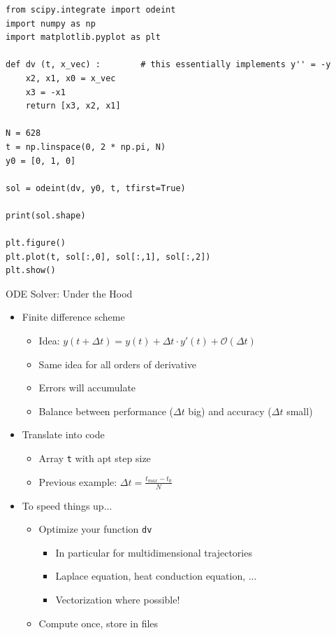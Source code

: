 
\begin{frame}[fragile]
%
\begin{codebox}
\begin{verbatim}
from scipy.integrate import odeint
import numpy as np
import matplotlib.pyplot as plt

def dv (t, x_vec) :        # this essentially implements y'' = -y
    x2, x1, x0 = x_vec
    x3 = -x1
    return [x3, x2, x1]

N = 628
t = np.linspace(0, 2 * np.pi, N)
y0 = [0, 1, 0]

sol = odeint(dv, y0, t, tfirst=True)

print(sol.shape)

plt.figure()
plt.plot(t, sol[:,0], sol[:,1], sol[:,2])
plt.show()
\end{verbatim}
\end{codebox}
%
\end{frame}


\begin{frame}{ODE Solver: Under the Hood}
%
\begin{itemize}
\item Finite difference scheme
	\begin{itemize}
	\item Idea: $y(t + \Delta t) = y(t) + \Delta t \cdot y'(t) + \mathcal{O}(\Delta t)$
	\item Same idea for all orders of derivative
	\item Errors will accumulate
	\item Balance between performance ($\Delta t$ big) and accuracy ($\Delta t$ small)
	\end{itemize}
\item Translate into code
	\begin{itemize}
	\item Array \texttt{t} with apt step size
	\item Previous example: $\Delta t = \frac{t_{max} - t_0}{N}$
	\end{itemize}
\item To speed things up...
	\begin{itemize}
	\item Optimize your function \texttt{dv}
		\begin{itemize}
		\item In particular for multidimensional trajectories 
		\item Laplace equation, heat conduction equation, ...
		\item Vectorization where possible!
		\end{itemize}
	\item Compute once, store in files
	\end{itemize}
\end{itemize}
%
\end{frame}

